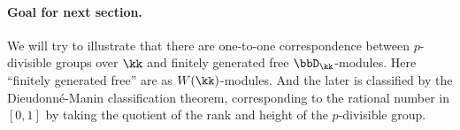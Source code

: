 \paragraph{Goal for next section.}
We will try to illustrate that there are one-to-one correspondence between $p$-divisible groups over $\kk$ and finitely generated free $\bbD_\kk$-modules.
Here ``finitely generated free'' are as $W(\kk)$-modules.
And the later is classified by the Dieudonné-Manin classification theorem, corresponding to the rational number in $[0,1]$ by taking the quotient of the rank and height of the $p$-divisible group.






































